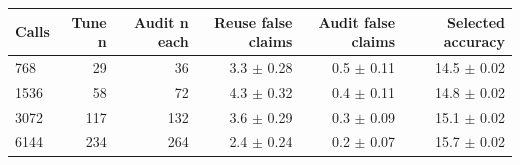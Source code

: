 \begin{tabular}{lrrrrr}
\toprule
Calls & Tune n & Audit n each & Reuse false claims & Audit false claims & Selected accuracy \\
\midrule
768 & 29 & 36 & 3.3 $\pm$ 0.28 & 0.5 $\pm$ 0.11 & 14.5 $\pm$ 0.02 \\
1536 & 58 & 72 & 4.3 $\pm$ 0.32 & 0.4 $\pm$ 0.11 & 14.8 $\pm$ 0.02 \\
3072 & 117 & 132 & 3.6 $\pm$ 0.29 & 0.3 $\pm$ 0.09 & 15.1 $\pm$ 0.02 \\
6144 & 234 & 264 & 2.4 $\pm$ 0.24 & 0.2 $\pm$ 0.07 & 15.7 $\pm$ 0.02 \\
\bottomrule
\end{tabular}
